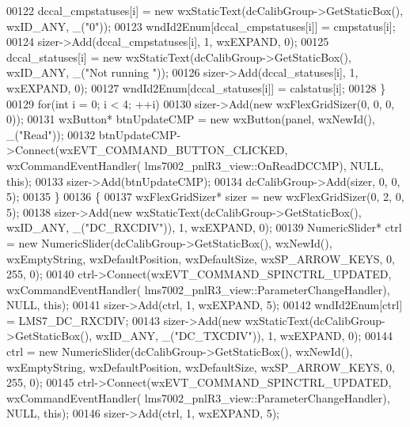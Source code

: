 \begin{DoxyCode}
00122                 dccal_cmpstatuses[i] = \textcolor{keyword}{new} wxStaticText(dcCalibGroup->GetStaticBox(), wxID\_ANY, \_(\textcolor{stringliteral}{"0"}));
00123                 wndId2Enum[dccal_cmpstatuses[i]] = cmpstatus[i];
00124                 sizer->Add(dccal\_cmpstatuses[i], 1, wxEXPAND, 0);
00125                 dccal_statuses[i] = \textcolor{keyword}{new} wxStaticText(dcCalibGroup->GetStaticBox(), wxID\_ANY, \_(\textcolor{stringliteral}{"Not running
      "}));
00126                 sizer->Add(dccal_statuses[i], 1, wxEXPAND, 0);
00127                 wndId2Enum[dccal_statuses[i]] = calstatus[i];
00128             \}
00129             \textcolor{keywordflow}{for}(\textcolor{keywordtype}{int} i = 0; i < 4; ++i)
00130                 sizer->Add(\textcolor{keyword}{new} wxFlexGridSizer(0, 0, 0, 0));
00131             wxButton* btnUpdateCMP = \textcolor{keyword}{new} wxButton(panel, wxNewId(), \_(\textcolor{stringliteral}{"Read"}));
00132             btnUpdateCMP->Connect(wxEVT\_COMMAND\_BUTTON\_CLICKED, wxCommandEventHandler(
      lms7002_pnlR3_view::OnReadDCCMP), NULL, \textcolor{keyword}{this});
00133             sizer->Add(btnUpdateCMP);
00134             dcCalibGroup->Add(sizer, 0, 0, 5);
00135         \}
00136         \{
00137             wxFlexGridSizer* sizer = \textcolor{keyword}{new} wxFlexGridSizer(0, 2, 0, 5);
00138             sizer->Add(\textcolor{keyword}{new} wxStaticText(dcCalibGroup->GetStaticBox(), wxID\_ANY, \_(\textcolor{stringliteral}{"DC\_RXCDIV"})), 1, 
      wxEXPAND, 0);
00139             NumericSlider* ctrl = \textcolor{keyword}{new} NumericSlider(dcCalibGroup->GetStaticBox(), wxNewId(), wxEmptyString,
       wxDefaultPosition, wxDefaultSize, wxSP\_ARROW\_KEYS, 0, 255, 0);
00140             ctrl->Connect(wxEVT\_COMMAND\_SPINCTRL\_UPDATED, wxCommandEventHandler(
      lms7002_pnlR3_view::ParameterChangeHandler), NULL, \textcolor{keyword}{this});
00141             sizer->Add(ctrl, 1, wxEXPAND, 5);
00142             wndId2Enum[ctrl] = LMS7_DC_RXCDIV;
00143             sizer->Add(\textcolor{keyword}{new} wxStaticText(dcCalibGroup->GetStaticBox(), wxID\_ANY, \_(\textcolor{stringliteral}{"DC\_TXCDIV"})), 1, 
      wxEXPAND, 0);
00144             ctrl = \textcolor{keyword}{new} NumericSlider(dcCalibGroup->GetStaticBox(), wxNewId(), wxEmptyString, 
      wxDefaultPosition, wxDefaultSize, wxSP\_ARROW\_KEYS, 0, 255, 0);
00145             ctrl->Connect(wxEVT\_COMMAND\_SPINCTRL\_UPDATED, wxCommandEventHandler(
      lms7002_pnlR3_view::ParameterChangeHandler), NULL, \textcolor{keyword}{this});
00146             sizer->Add(ctrl, 1, wxEXPAND, 5);

\end{DoxyCode}

